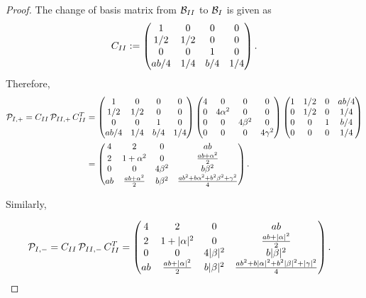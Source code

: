 \documentclass[10pt,a4paper]{amsart}
\begin{document}
\begin{proof}
    The change of basis matrix from $\mathcal{B}_{\rm{II}}$ to $\mathcal{B}_{\rm{I}}$ is given as
    $$
    C_{\rm{II}}:= 
    \begin{pmatrix}
1 & 0 & 0 & 0 \\
1/2 & 1/2 & 0 & 0 \\
0 & 0 & 1 & 0 \\
ab/4 & 1/4 & b/4 & 1/4
\end{pmatrix}.
    $$
    Therefore, 
    \begin{align*}
    \mathcal{P}_{\rm{I}, +} = C_{\rm{II}} \, \mathcal{P}_{\rm{II}, +} \, C_{\rm{II}}^T &= 
    \begin{pmatrix}
1 & 0 & 0 & 0 \\
1/2 & 1/2 & 0 & 0 \\
0 & 0 & 1 & 0 \\
ab/4 & 1/4 & b/4 & 1/4
\end{pmatrix}
\begin{pmatrix}
4 & 0 & 0 & 0 \\
0 & 4\alpha^2 & 0 & 0 \\
0 & 0 & 4\beta^2 & 0 \\
0 & 0 & 0 & 4\gamma^2
\end{pmatrix}
 \begin{pmatrix}
1 & 1/2 & 0 & ab/4 \\
0 & 1/2 & 0 & 1/4 \\
0 & 0 & 1 &  b/4 \\
0 & 0 &0 & 1/4
\end{pmatrix} \\ 
&= \begin{pmatrix}
4 & 2 & 0 & ab \\
2 & 1 + \alpha^2 & 0 & \frac{ab + \alpha^2}{2} \\
0 & 0 & 4\beta^2 & b\beta^2 \\
ab & \frac{ab + \alpha^2}{2} & b\beta^2 & \frac{a b^2 + b \alpha^2 + b^2 \beta^2 + \gamma^2}{4}
\end{pmatrix}.
    \end{align*}

\noindent
Similarly, 
 
    \begin{align*}
    \mathcal{P}_{\rm{I}, -} = C_{\rm{II}} \, \mathcal{P}_{\rm{II}, -} \, C_{\rm{II}}^T &= \begin{pmatrix}
4 & 2 & 0 & ab \\
2 & 1 + |\alpha|^2 & 0 & \frac{ab + |\alpha|^2}{2} \\
0 & 0 & 4|\beta|^2 & b|\beta|^2 \\
ab & \frac{ab + |\alpha|^2}{2} & b|\beta|^2 & \frac{a b^2 + b |\alpha|^2 + b^2 |\beta|^2 + |\gamma|^2}{4}
\end{pmatrix}.
    \end{align*}
\end{proof}
\end{document}
